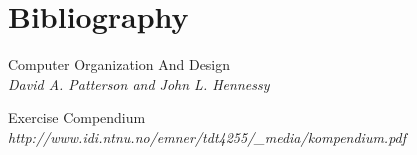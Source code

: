 \section{Bibliography}

\begin{enumerate}
	 Computer Organization And Design\\
		\emph{David A. Patterson and John L. Hennessy}

	 Exercise Compendium\\
		\emph{http://www.idi.ntnu.no/emner/tdt4255/\_media/kompendium.pdf}

\end{enumerate}
